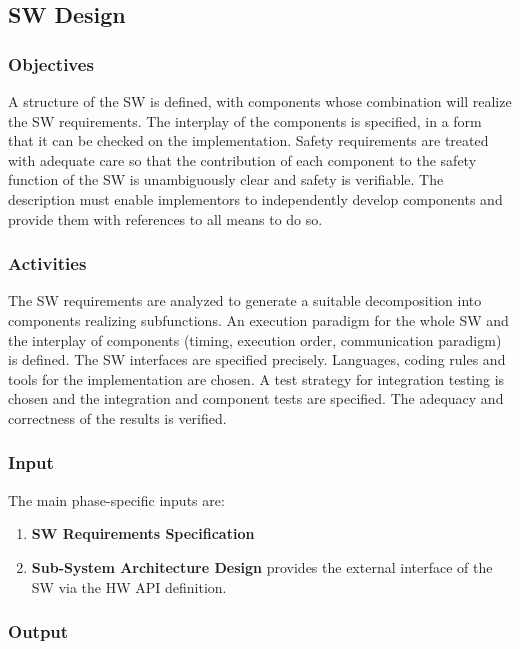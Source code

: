 \documentclass{template/openetcs_article}
\begin{document}
\subsection{SW Design}
\label{sec:softw-arch-desi-phase}

\subsubsection{Objectives}
\label{sec:4-objectives}

A structure of the SW is defined, with components whose combination
will realize the SW requirements. The interplay of the components is
specified, in a form that it can be checked on the
implementation. Safety requirements are treated with adequate care so
that the contribution of each component to the safety function of the
SW is unambiguously clear and safety is verifiable. The description
must enable implementors to independently develop components and
provide them with references to all means to do so.

\subsubsection{Activities}
\label{sec:4-activities}

The SW requirements are analyzed to generate a suitable decomposition
into components realizing subfunctions. An execution paradigm for the
whole SW and the interplay of components (timing, execution order,
communication paradigm) is defined. The SW interfaces are specified
precisely. Languages, coding rules and tools for the implementation
are chosen. A test strategy for integration testing is chosen and the
integration and component tests are specified. The adequacy and
correctness of the results is verified.


\subsubsection{Input}
\label{sec:4-input}

The main phase-specific inputs are:
\begin{enumerate}
\item \textbf{SW Requirements Specification}
\item \textbf{Sub-System Architecture Design} provides the external
  interface of the SW via the HW API definition.
\end{enumerate}

\subsubsection{Output}
\label{sec:4-output}
\end{document}

